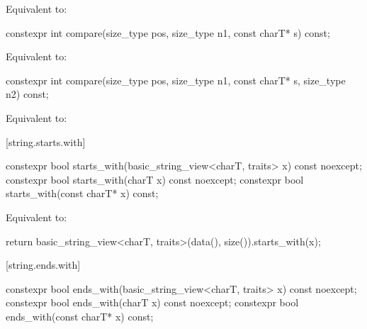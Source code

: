 \begin{itemdescr}
\pnum
\effects
Equivalent to:
\end{itemdescr}

%
\begin{itemdecl}
constexpr int compare(size_type pos, size_type n1, const charT* s) const;
\end{itemdecl}

\begin{itemdescr}
\pnum
\effects
Equivalent to: 
\end{itemdescr}

%
\begin{itemdecl}
constexpr int compare(size_type pos, size_type n1, const charT* s, size_type n2) const;
\end{itemdecl}

\begin{itemdescr}
\pnum
\effects
Equivalent to: 
\end{itemdescr}

[string.starts.with]{}

%
\begin{itemdecl}
constexpr bool starts_with(basic_string_view<charT, traits> x) const noexcept;
constexpr bool starts_with(charT x) const noexcept;
constexpr bool starts_with(const charT* x) const;
\end{itemdecl}

\begin{itemdescr}
\pnum
\effects
Equivalent to:
\begin{codeblock}
return basic_string_view<charT, traits>(data(), size()).starts_with(x);
\end{codeblock}
\end{itemdescr}

[string.ends.with]{}

%
\begin{itemdecl}
constexpr bool ends_with(basic_string_view<charT, traits> x) const noexcept;
constexpr bool ends_with(charT x) const noexcept;
constexpr bool ends_with(const charT* x) const;
\end{itemdecl}

